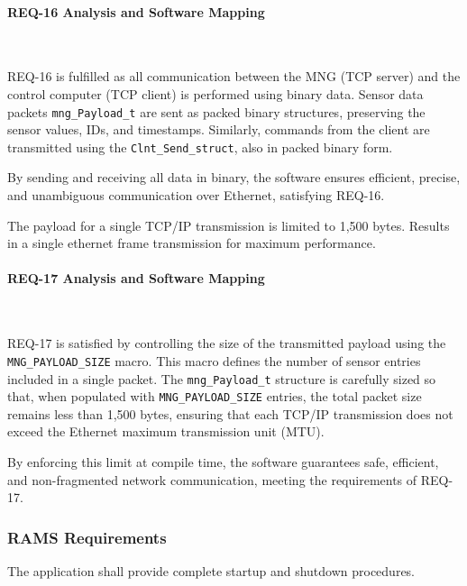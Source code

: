 \paragraph{REQ-16 Analysis and Software Mapping}\


REQ-16 is fulfilled as all communication between the MNG (TCP server) and the 
control computer (TCP client) is performed using binary data. Sensor data packets 
\texttt{mng\_Payload\_t} are sent as packed binary structures, preserving the sensor values, 
IDs, and timestamps. Similarly, commands from the client are transmitted using the 
\texttt{Clnt\_Send\_struct}, also in packed binary form. 

By sending and receiving all data in binary, the software ensures efficient, 
precise, and unambiguous communication over Ethernet, satisfying REQ-16.


\begin{tcolorbox}[
    title=REQ-17,
    colback=gray!5,
    colframe=black,
    fonttitle=\bfseries
]
The payload for a single TCP/IP transmission is limited to 1,500 bytes.
Results in a single ethernet frame transmission for maximum performance.
\end{tcolorbox}

\paragraph{REQ-17 Analysis and Software Mapping}\

REQ-17 is satisfied by controlling the size of the transmitted payload using the 
\texttt{MNG\_PAYLOAD\_SIZE}  macro. This macro defines the number of sensor entries included 
in a single packet. The  \texttt{mng\_Payload\_t} structure is carefully sized so that, when 
populated with \texttt{MNG\_PAYLOAD\_SIZE} entries, the total packet size remains less 
than 1,500 bytes, ensuring that each TCP/IP transmission does not exceed the 
Ethernet maximum transmission unit (MTU).

By enforcing this limit at compile time, the software guarantees safe, efficient, 
and non-fragmented network communication, meeting the requirements of REQ-17.

\subsubsection{RAMS Requirements}

\begin{tcolorbox}[
    title=REQ-18,
    colback=gray!5,
    colframe=black,
    fonttitle=\bfseries
]
The application shall provide complete startup and shutdown procedures.
\end{tcolorbox}

